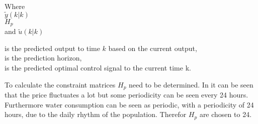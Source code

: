  \begin{minipage}[t]{0.20\textwidth}
 Where\\
 \hspace*{8mm} $\tilde y(k|k)$ \\
 \hspace*{8mm} $H_p$ \\
 and \hspace*{0.7mm} $\tilde u(k|k)$	
 \end{minipage}
 \begin{minipage}[t]{0.68\textwidth}
 \vspace*{2mm}
 is the predicted output to time $k$ based on the current output, \\
 is the prediction horizon,\\
 is the predicted optimal control signal to the current time k.
 \end{minipage}

To calculate the constraint matrices $H_p$ need to be determined. In  it can be seen that the price fluctuates a lot but some periodicity can be seen every 24 hours. Furthermore water consumption can be seen as periodic, with a periodicity of 24 hours, due to the daily rhythm of the population. Therefor $H_p$ are chosen to 24. 





